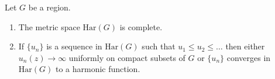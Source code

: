 Let $G$ be a region.
\begin{enumerate}
\item[(a)] The metric space $\text{Har}(G)$ is complete.
\item[(b)] If $\{u_n\}$ is a sequence in $\text{Har}(G)$ such that $u_1 \leq u_2 \leq \ldots$ then either $u_n(z) \to \infty$ uniformly on compact subsets of $G$ or $\{u_n\}$ converges in $\text{Har}(G)$ to a harmonic function.
\end{enumerate}
